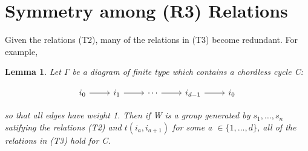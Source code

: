 \documentclass[11pt]{amsart}
\newtheorem{lem}[thm]{Lemma}
\theoremstyle{definition}
\begin{document}
\section{Symmetry among (R3) Relations}
\label{sec:one_relation}

Given the relations (T2), many of the relations in (T3) become redundant. For example,

\begin{lem}
Let $\Gamma$ be a diagram of finite type which contains a chordless cycle C:

\begin{equation*}
\begin{tikzcd}
i_0 \arrow{r} & i_1 \arrow{r} & \cdots \arrow{r} & i_{d-1} \arrow{r} & i_0
\end{tikzcd}
\end{equation*}

so that all edges have weight 1. Then if W is a group generated by $s_{1}, \dots, s_{n}$ satifying the relations (T2) and $t(i_{a}, i_{a+1})$ for some a $\in \{1, \dots, d\}$, all of the relations in (T3) hold for C.
\end{lem}
\end{document}

